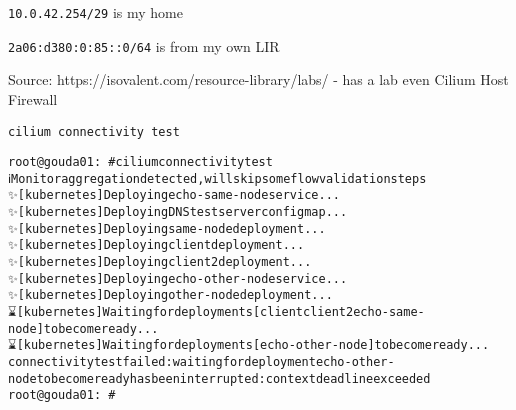 \documentclass[Screen16to9,17pt]{foils}
\begin{document}
\begin{list2}
\item {}
\item \verb+10.0.42.254/29+ is my home
\item \verb+2a06:d380:0:85::0/64+ is from my own LIR
\end{list2}

Source:
https://isovalent.com/resource-library/labs/ - has a lab even Cilium Host Firewall





\verb+cilium connectivity test+



\begin{alltt}
root@gouda01:~# cilium connectivity test
ℹ️  Monitor aggregation detected, will skip some flow validation steps
✨ [kubernetes] Deploying echo-same-node service...
✨ [kubernetes] Deploying DNS test server configmap...
✨ [kubernetes] Deploying same-node deployment...
✨ [kubernetes] Deploying client deployment...
✨ [kubernetes] Deploying client2 deployment...
✨ [kubernetes] Deploying echo-other-node service...
✨ [kubernetes] Deploying other-node deployment...
⌛ [kubernetes] Waiting for deployments [client client2 echo-same-node] to become ready...
⌛ [kubernetes] Waiting for deployments [echo-other-node] to become ready...
connectivity test failed: waiting for deployment echo-other-node to become ready has been interrupted: context deadline exceeded
root@gouda01:~#
\end{alltt}
\end{document}
